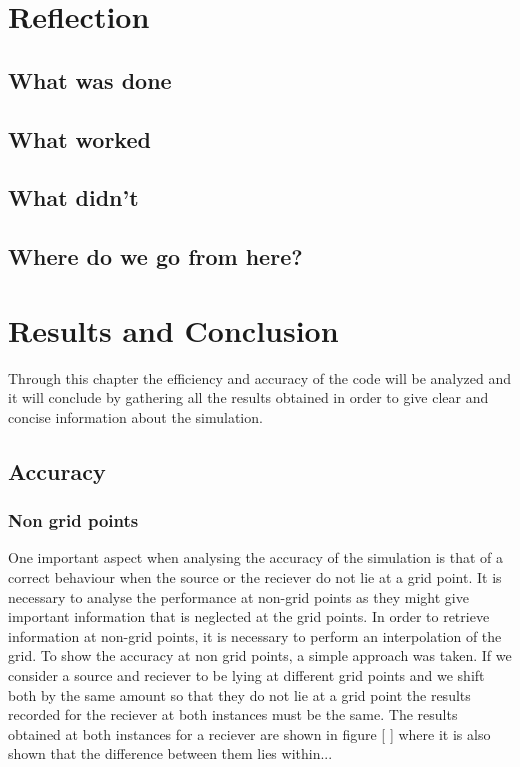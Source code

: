 %
%
%

\chapter{Reflection}\label{reflection}

\section{What was done}\label{what-was-done}

\section{What worked}\label{what-worked}

\section{What didn't}\label{what-didnt}

\section{Where do we go from
here?}\label{where-do-we-go-from-here}

\chapter{Results and Conclusion}
\label{chapter5}
Through this chapter the efficiency and accuracy of the code will be analyzed and it will conclude by gathering all the results obtained in order to give clear and concise information about the simulation.
\section{Accuracy}
\label{chapter5:sec1}
\subsection{Non grid points}
\label{chapter5:sec1:ss1}
One important aspect when analysing the accuracy of the simulation is that of a correct behaviour when the source or the reciever do not lie at a grid point. It is necessary to analyse the performance at non-grid points as they might give important information that is neglected at the grid points. In order to retrieve information at non-grid points, it is necessary to perform an interpolation of the grid. To show the accuracy at non grid points, a simple approach was taken. If we consider a source and reciever to be lying at different grid points and we shift both by the same amount so that they do not lie at a grid point  the results recorded for the reciever at both instances must be the same. The results obtained at both instances for a reciever are shown in figure [ ] where it is also shown that the difference between them lies within...
\label{chapter5:sec2}
